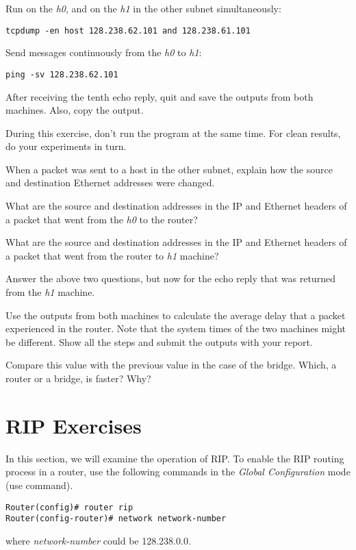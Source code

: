 \documentclass{../UTNetLab}
\begin{document}
Run  on the \textit{h0}, and  on the \textit{h1} in the other subnet simultaneously:
\begin{lstlisting}[emph={h0,h1,netlab},morekeywords={[3]host,and}]
tcpdump -en host 128.238.62.101 and 128.238.61.101
    \end{lstlisting}
Send  messages continuously from the \textit{h0} to \textit{h1}:
\begin{lstlisting}[emph={h1, netlab}]
ping -sv 128.238.62.101
    \end{lstlisting}
After receiving the tenth echo reply, quit  and save the  outputs from both machines.
Also, copy the  output.

During this exercise, don’t run the  program at the same time.
For clean results, do your experiments in turn.

\begin{report}
    \item When a packet was sent to a host in the other subnet, explain how the source and destination Ethernet addresses were changed.

    \item What are the source and destination addresses in the IP and Ethernet headers of a packet that went from the \textit{h0} to the router?

    \item What are the source and destination addresses in the IP and Ethernet headers of a packet that went from the router to \textit{h1} machine?

    \item Answer the above two questions, but now for the echo reply that was returned from the \textit{h1} machine.

    \item Use the  outputs from both machines to calculate the average delay that a packet experienced in the router.
    Note that the system times of the two machines might be different.
    Show all the steps and submit the  outputs with your report.

    \item Compare this value with the previous value in the case of the bridge.
    Which, a router or a bridge, is faster? Why?
\end{report}

\part{RIP Exercises}\label{sec:rip}
In this section, we will examine the operation of RIP.
To enable the RIP routing process in a router, use the following commands in the \textit{Global Configuration} mode (use  command).
\begin{lstlisting}[language={cisco}, emph={network-number}]
Router(config)# router rip
Router(config-router)# network network-number
    \end{lstlisting}
where \textit{network-number} could be 128.238.0.0.
\end{document}
